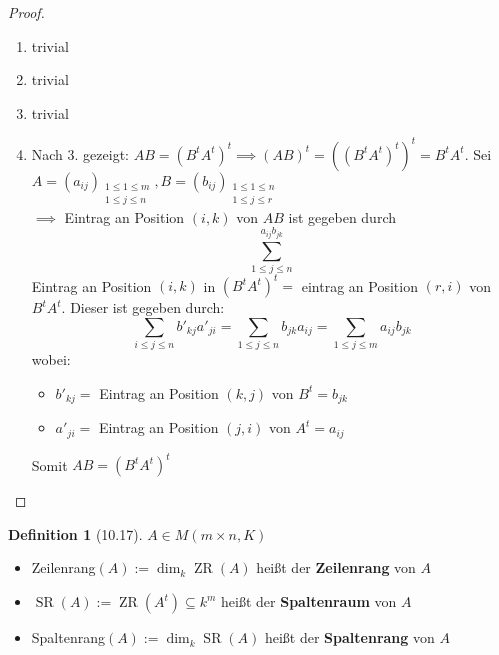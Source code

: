 \documentclass[a4paper]{scrartcl}
\DeclareMathOperator{\ZR}{ZR}
\DeclareMathOperator{\SR}{SR}
\theoremstyle{definition}
\newtheorem{defn}{Definition}
\theoremstyle{plain}
\theoremstyle{plain}
\theoremstyle{remark}
\theoremstyle{remark}
\theoremstyle{remark}
\theoremstyle{remark}
\theoremstyle{remark}
\begin{document}
\begin{proof}
\begin{enumerate}
\item trivial
\item trivial
\item trivial
\item Nach 3. gezeigt: $AB = (B^t A^t)^t \implies (AB)^t = ((B^t A^t)^t)^t = B^t A^t$.
    Sei $A = (a_{ij})_{\substack{1 \leq 1 \leq m \\ 1 \leq j \leq n}}, B = (b_{ij})_{\substack{1 \leq 1 \leq n \\ 1 \leq j \leq r}}$ \\
         $\implies$ Eintrag an Position $(i,k)$ von $AB$ ist gegeben durch
    \[\sum_{1\leq j\leq n}^{a_{ij}b_{jk}}\]
    Eintrag an Position $(i,k)$ in $(B^t A^t)^t =$ eintrag an Position $(r,i)$ von $B^t A^t$.
    Dieser ist gegeben durch:
\[\sum_{i\leq j \leq n} b'_{kj} a'_{ji} = \sum_{1\leq j\leq n} b_{jk} a_{ij} = \sum_{1 \leq j \leq m} a_{ij} b_{jk} \]
    wobei:
\begin{itemize}
\item $b'_{kj} =$ Eintrag an Position $(k,j)$ von $B^t = b_{jk}$
\item $a'_{ji} =$ Eintrag an Position $(j,i)$ von $A^t = a_{ij}$
\end{itemize}
Somit $AB = (B^t A^t)^t$
\end{enumerate}
\end{proof}
\begin{defn}[10.17]
$A\in M(m\times n, K)$
\begin{itemize}
\item Zeilenrang$(A):= \dim_k \ZR(A)$ heißt der \textbf{Zeilenrang} von $A$
\item $\SR(A):= \ZR(A^t) \subseteq k^m$ heißt der \textbf{Spaltenraum} von $A$
\item Spaltenrang$(A):= \dim_k \SR(A)$ heißt der \textbf{Spaltenrang} von $A$
\end{itemize}
\end{defn}
\end{document}
